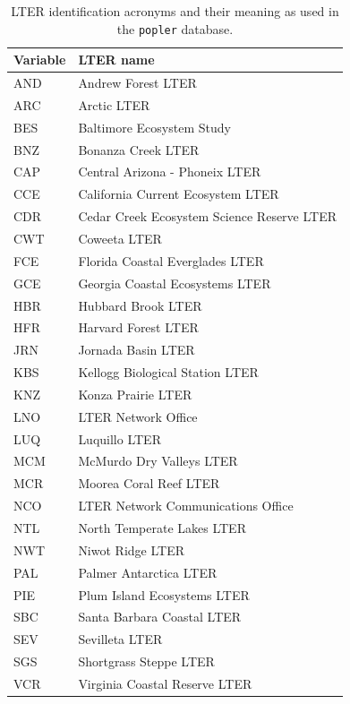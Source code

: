 \documentclass{article}\usepackage[]{graphicx}\usepackage[]{color}
\begin{document}
\newpage     
 \begin{table}[h!]
  \caption{LTER identification acronyms and their meaning as used in the \texttt{popler} database.}
  \label{Tab:S3}
   \begin{center}
     \begin{tabular}{l l}
      \hline
      Variable & LTER name\\
      \hline
AND & Andrew Forest LTER \\                        
ARC & Arctic LTER \\                               
BES & Baltimore Ecosystem Study \\                 
BNZ & Bonanza Creek LTER \\                        
CAP & Central Arizona - Phoneix LTER \\            
CCE & California Current Ecosystem LTER \\         
CDR & Cedar Creek Ecosystem Science Reserve LTER \\
CWT & Coweeta LTER \\                              
FCE & Florida Coastal Everglades LTER \\           
GCE & Georgia Coastal Ecosystems LTER \\           
HBR & Hubbard Brook LTER \\                        
HFR & Harvard Forest LTER \\                       
JRN & Jornada Basin LTER \\                        
KBS & Kellogg Biological Station LTER \\           
KNZ & Konza Prairie LTER \\                        
LNO & LTER Network Office \\                       
LUQ & Luquillo LTER \\                             
MCM & McMurdo Dry Valleys LTER \\                  
MCR & Moorea Coral Reef LTER \\                    
NCO & LTER Network Communications Office \\        
NTL & North Temperate Lakes LTER \\                
NWT & Niwot Ridge LTER \\                          
PAL & Palmer Antarctica LTER \\                    
PIE & Plum Island Ecosystems LTER \\               
SBC & Santa Barbara Coastal LTER \\                
SEV & Sevilleta LTER  \\                           
SGS & Shortgrass Steppe LTER \\                    
VCR & Virginia Coastal Reserve LTER \\
      \hline
     \end{tabular}
   \end{center}
 \end{table}
\end{document}
